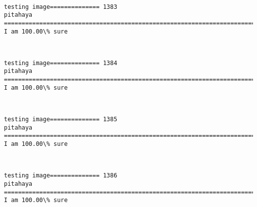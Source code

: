 \documentclass[11pt]{article}
\begin{document}
    \begin{center}
    \end{center}
    { \hspace*{\fill} \\}
    
    \begin{Verbatim}[commandchars=\\\{\}]
testing image============== 1383
pitahaya
============================================================================
I am 100.00\% sure

    \end{Verbatim}

    \begin{center}
    \end{center}
    { \hspace*{\fill} \\}
    
    \begin{Verbatim}[commandchars=\\\{\}]
testing image============== 1384
pitahaya
============================================================================
I am 100.00\% sure

    \end{Verbatim}

    \begin{center}
    \end{center}
    { \hspace*{\fill} \\}
    
    \begin{Verbatim}[commandchars=\\\{\}]
testing image============== 1385
pitahaya
============================================================================
I am 100.00\% sure

    \end{Verbatim}

    \begin{center}
    \end{center}
    { \hspace*{\fill} \\}
    
    \begin{Verbatim}[commandchars=\\\{\}]
testing image============== 1386
pitahaya
============================================================================
I am 100.00\% sure

    \end{Verbatim}
\end{document}
